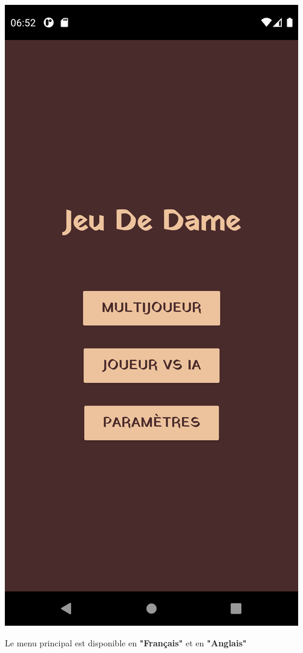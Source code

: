 \documentclass{beamer}
\begin{document}
\begin{frame}
\begin{center}
    \includegraphics[scale=0.05]{menu_fr.png}
  \end{center}

  Le menu principal est disponible en \textbf{"Français"} et en \textbf{"Anglais"}

\end{frame}
\end{document}
